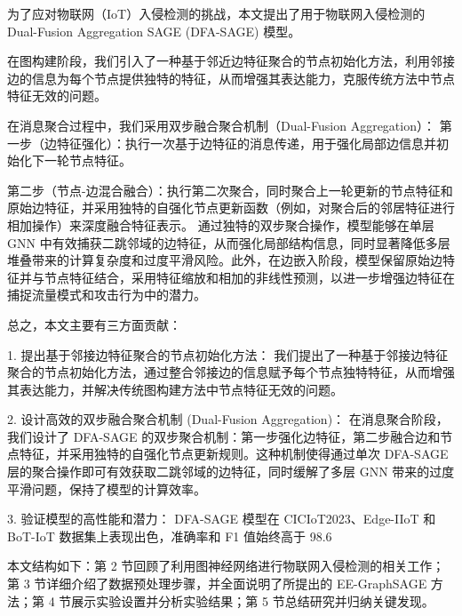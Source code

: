 \documentclass{article}
\begin{document}
为了应对物联网（IoT）入侵检测的挑战，本文提出了用于物联网入侵检测的 Dual-Fusion Aggregation SAGE (DFA-SAGE) 模型。

在图构建阶段，我们引入了一种基于邻近边特征聚合的节点初始化方法，利用邻接边的信息为每个节点提供独特的特征，从而增强其表达能力，克服传统方法中节点特征无效的问题。

在消息聚合过程中，我们采用双步融合聚合机制（Dual-Fusion Aggregation）：
第一步（边特征强化）：执行一次基于边特征的消息传递，用于强化局部边信息并初始化下一轮节点特征。

第二步（节点-边混合融合）：执行第二次聚合，同时聚合上一轮更新的节点特征和原始边特征，并采用独特的自强化节点更新函数（例如，对聚合后的邻居特征进行相加操作）来深度融合特征表示。
通过独特的双步聚合操作，模型能够在单层 GNN 中有效捕获二跳邻域的边特征，从而强化局部结构信息，同时显著降低多层堆叠带来的计算复杂度和过度平滑风险。此外，在边嵌入阶段，模型保留原始边特征并与节点特征结合，采用特征缩放和相加的非线性预测，以进一步增强边特征在捕捉流量模式和攻击行为中的潜力。

总之，本文主要有三方面贡献：

1. 提出基于邻接边特征聚合的节点初始化方法： 我们提出了一种基于邻接边特征聚合的节点初始化方法，通过整合邻接边的信息赋予每个节点独特特征，从而增强其表达能力，并解决传统图构建方法中节点特征无效的问题。

2. 设计高效的双步融合聚合机制 (Dual-Fusion Aggregation)： 在消息聚合阶段，我们设计了 DFA-SAGE 的双步聚合机制：第一步强化边特征，第二步融合边和节点特征，并采用独特的自强化节点更新规则。这种机制使得通过单次 DFA-SAGE 层的聚合操作即可有效获取二跳邻域的边特征，同时缓解了多层 GNN 带来的过度平滑问题，保持了模型的计算效率。

3. 验证模型的高性能和潜力： DFA-SAGE 模型在 CICIoT2023、Edge-IIoT 和 BoT-IoT 数据集上表现出色，准确率和 F1 值始终高于 98.6%

本文结构如下：第 2 节回顾了利用图神经网络进行物联网入侵检测的相关工作；第 3 节详细介绍了数据预处理步骤，并全面说明了所提出的 EE-GraphSAGE 方法；第 4 节展示实验设置并分析实验结果；第 5 节总结研究并归纳关键发现。


\end{document}
